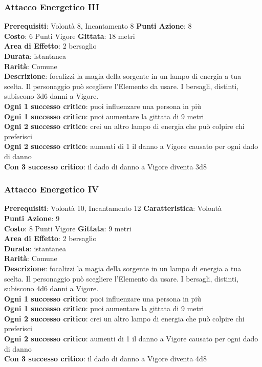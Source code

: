 \documentclass[12pt,a4paper,twoside,openany]{book}
\begin{document}
\begin{multicols}{2}
\subsubsection*{Attacco Energetico III}
\textbf{Prerequisiti}: Volontà 8, Incantamento 8
\textbf{Punti Azione}: 8\\
\textbf{Costo}: 6 Punti Vigore
\textbf{Gittata}: 18 metri\\
\textbf{Area di Effetto}: 2 bersaglio\\
\textbf{Durata}: istantanea\\
\textbf{Rarità}: Comune\\
\textbf{Descrizione}: focalizzi la magia della sorgente in un lampo di energia a tua scelta. Il personaggio può scegliere l'Elemento da usare.
I bersagli, distinti, subiscono 3d6 danni a Vigore.\\
\textbf{Ogni 1 successo critico}: puoi influenzare una persona in più \\
\textbf{Ogni 1 successo critico}: puoi aumentare la gittata di 9 metri\\
\textbf{Ogni 2 successo critico}: crei un altro lampo di energia che può colpire chi preferisci\\
\textbf{Ogni 2 successo critico}: aumenti di 1 il danno a Vigore causato per ogni dado di danno\\
\textbf{Con 3 successo critico}: il dado di danno a Vigore diventa 3d8

\subsubsection*{Attacco Energetico IV}
\textbf{Prerequisiti}: Volontà 10, Incantamento 12
\textbf{Caratteristica}: Volontà\\
\textbf{Punti Azione}: 9\\
\textbf{Costo}: 8 Punti Vigore
\textbf{Gittata}: 9 metri\\
\textbf{Area di Effetto}: 2 bersaglio\\
\textbf{Durata}: istantanea\\
\textbf{Rarità}: Comune\\
\textbf{Descrizione}: focalizzi la magia della sorgente in un lampo di energia a tua scelta. Il personaggio può scegliere l'Elemento da usare.
I bersagli, distinti, subiscono 4d6 danni a Vigore.\\
\textbf{Ogni 1 successo critico}: puoi influenzare una persona in più \\
\textbf{Ogni 1 successo critico}: puoi aumentare la gittata di 9 metri\\
\textbf{Ogni 2 successo critico}: crei un altro lampo di energia che può colpire chi preferisci\\
\textbf{Ogni 2 successo critico}: aumenti di 1 il danno a Vigore causato per ogni dado di danno\\
\textbf{Con 3 successo critico}: il dado di danno a Vigore diventa 4d8


\end{multicols}
\end{document}
